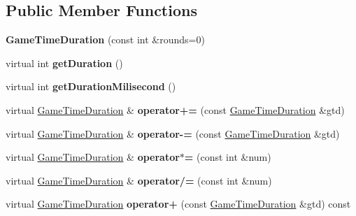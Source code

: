 \subsection*{Public Member Functions}
\begin{DoxyCompactItemize}
\item 
{\bfseries Game\+Time\+Duration} (const int \&rounds=0)\hypertarget{class_game_time_duration_a69ea724c3d6e70f672de9c819b0bd64d}{}\label{class_game_time_duration_a69ea724c3d6e70f672de9c819b0bd64d}

\item 
virtual int {\bfseries get\+Duration} ()\hypertarget{class_game_time_duration_a78b20410ac6697ec236cca73ea5a153a}{}\label{class_game_time_duration_a78b20410ac6697ec236cca73ea5a153a}

\item 
virtual int {\bfseries get\+Duration\+Milisecond} ()\hypertarget{class_game_time_duration_afb0d9b8159446470847a950789a6ee73}{}\label{class_game_time_duration_afb0d9b8159446470847a950789a6ee73}

\item 
virtual \hyperlink{class_game_time_duration}{Game\+Time\+Duration} \& {\bfseries operator+=} (const \hyperlink{class_game_time_duration}{Game\+Time\+Duration} \&gtd)\hypertarget{class_game_time_duration_ac4de98d0a1a0471bb95143340fbce542}{}\label{class_game_time_duration_ac4de98d0a1a0471bb95143340fbce542}

\item 
virtual \hyperlink{class_game_time_duration}{Game\+Time\+Duration} \& {\bfseries operator-\/=} (const \hyperlink{class_game_time_duration}{Game\+Time\+Duration} \&gtd)\hypertarget{class_game_time_duration_a68b9972b9d3c6e2a082b11149ebc3dea}{}\label{class_game_time_duration_a68b9972b9d3c6e2a082b11149ebc3dea}

\item 
virtual \hyperlink{class_game_time_duration}{Game\+Time\+Duration} \& {\bfseries operator$\ast$=} (const int \&num)\hypertarget{class_game_time_duration_af531db9a28a660521736054172249556}{}\label{class_game_time_duration_af531db9a28a660521736054172249556}

\item 
virtual \hyperlink{class_game_time_duration}{Game\+Time\+Duration} \& {\bfseries operator/=} (const int \&num)\hypertarget{class_game_time_duration_a9506d7c282e09af4e652dbd3a1d81eba}{}\label{class_game_time_duration_a9506d7c282e09af4e652dbd3a1d81eba}

\item 
virtual \hyperlink{class_game_time_duration}{Game\+Time\+Duration} {\bfseries operator+} (const \hyperlink{class_game_time_duration}{Game\+Time\+Duration} \&gtd) const \hypertarget{class_game_time_duration_a98fabf92533d3d35842012b6896ef8f3}{}\label{class_game_time_duration_a98fabf92533d3d35842012b6896ef8f3}


\end{DoxyCompactItemize}
